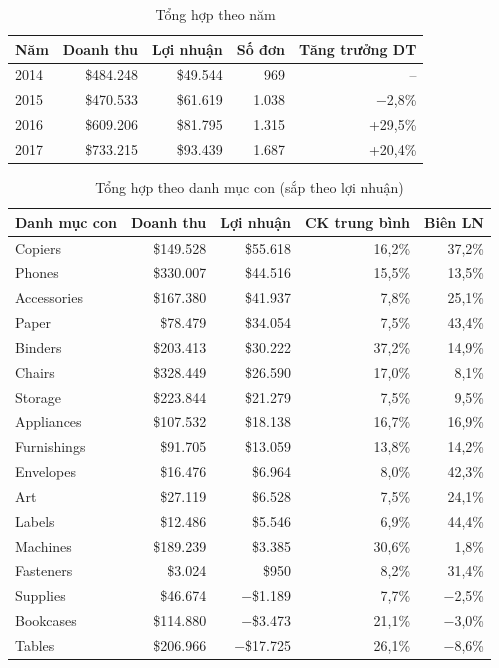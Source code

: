 \documentclass[12pt,a4paper]{article}
\newcommand{\usd}[1]{\$#1}
\begin{document}
\begin{table}[H]
\centering
\caption{Tổng hợp theo năm}\label{tab:nam}
\begin{tabular}{@{}lrrrr@{}}
\toprule
\textbf{Năm} & \textbf{Doanh thu} & \textbf{Lợi nhuận} & \textbf{Số đơn} & \textbf{Tăng trưởng DT} \\
\midrule
2014 & \usd{484.248} & \usd{49.544} & 969   & – \\
2015 & \usd{470.533} & \usd{61.619} & 1.038 & −2,8\% \\
2016 & \usd{609.206} & \usd{81.795} & 1.315 & +29,5\% \\
2017 & \usd{733.215} & \usd{93.439} & 1.687 & +20,4\% \\
\bottomrule
\end{tabular}
\end{table}

\begin{table}[H]
\centering
\caption{Tổng hợp theo danh mục con (sắp theo lợi nhuận)}\label{tab:subcat}
\small
\begin{tabular}{@{}lrrrr@{}}
\toprule
\textbf{Danh mục con} & \textbf{Doanh thu} & \textbf{Lợi nhuận} & \textbf{CK trung bình} & \textbf{Biên LN} \\
\midrule
Copiers     & \usd{149.528} & \usd{55.618} & 16,2\% & 37,2\% \\
Phones      & \usd{330.007} & \usd{44.516} & 15,5\% & 13,5\% \\
Accessories & \usd{167.380} & \usd{41.937} & 7,8\%  & 25,1\% \\
Paper       & \usd{78.479}  & \usd{34.054} & 7,5\%  & 43,4\% \\
Binders     & \usd{203.413} & \usd{30.222} & 37,2\% & 14,9\% \\
Chairs      & \usd{328.449} & \usd{26.590} & 17,0\% & 8,1\% \\
Storage     & \usd{223.844} & \usd{21.279} & 7,5\%  & 9,5\% \\
Appliances  & \usd{107.532} & \usd{18.138} & 16,7\% & 16,9\% \\
Furnishings & \usd{91.705}  & \usd{13.059} & 13,8\% & 14,2\% \\
Envelopes   & \usd{16.476}  & \usd{6.964}  & 8,0\%  & 42,3\% \\
Art         & \usd{27.119}  & \usd{6.528}  & 7,5\%  & 24,1\% \\
Labels      & \usd{12.486}  & \usd{5.546}  & 6,9\%  & 44,4\% \\
Machines    & \usd{189.239} & \usd{3.385}  & 30,6\% & 1,8\% \\
Fasteners   & \usd{3.024}   & \usd{950}    & 8,2\%  & 31,4\% \\
\rowcolor{red!8} Supplies  & \usd{46.674}  & −\usd{1.189}  & 7,7\%  & −2,5\% \\
\rowcolor{red!8} Bookcases & \usd{114.880} & −\usd{3.473}  & 21,1\% & −3,0\% \\
\rowcolor{red!8} Tables    & \usd{206.966} & −\usd{17.725} & 26,1\% & −8,6\% \\
\bottomrule
\end{tabular}
\end{table}
\end{document}
